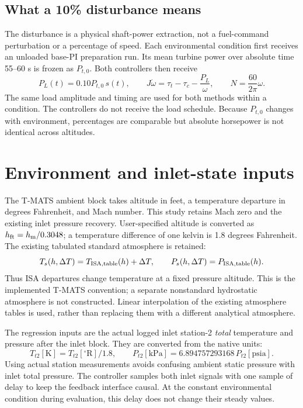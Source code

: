 \subsection{What a 10\% disturbance means}
The disturbance is a physical shaft-power extraction, not a fuel-command perturbation or a percentage of speed. Each environmental condition first receives an unloaded base-PI preparation run. Its mean turbine power over absolute time 55--60 s is frozen as $P_{t,0}$. Both controllers then receive
\begin{equation}
P_L(t)=0.10P_{t,0}\,s(t),\qquad
J\dot\omega=\tau_t-\tau_c-\frac{P_L}{\omega},\qquad N=\frac{60}{2\pi}\omega.
\end{equation}
The same load amplitude and timing are used for both methods within a condition. The controllers do not receive the load schedule. Because $P_{t,0}$ changes with environment, percentages are comparable but absolute horsepower is not identical across altitudes.

\clearpage
\section{Environment and inlet-state inputs}
The T-MATS ambient block takes altitude in feet, a temperature departure in degrees Fahrenheit, and Mach number. This study retains Mach zero and the existing inlet pressure recovery. User-specified altitude is converted as $h_{\rm ft}=h_{\rm m}/0.3048$; a temperature difference of one kelvin is 1.8 degrees Fahrenheit. The existing tabulated standard atmosphere is retained:
\begin{equation}
T_s(h,\Delta T)=T_{\rm ISA,table}(h)+\Delta T,\qquad
P_s(h,\Delta T)=P_{\rm ISA,table}(h).
\end{equation}
Thus ISA departures change temperature at a fixed pressure altitude. This is the implemented T-MATS convention; a separate nonstandard hydrostatic atmosphere is not constructed. Linear interpolation of the existing atmosphere tables is used, rather than replacing them with a different analytical atmosphere.

The regression inputs are the actual logged inlet station-2 \emph{total} temperature and pressure after the inlet block. They are converted from the native units:
\begin{equation}
T_{t2}[\mathrm K]=T_{t2}[{}^\circ\mathrm R]/1.8,
\qquad P_{t2}[\mathrm{kPa}]=6.894757293168\,P_{t2}[\mathrm{psia}].
\end{equation}
Using actual station measurements avoids confusing ambient static pressure with inlet total pressure. The controller samples both inlet signals with one sample of delay to keep the feedback interface causal. At the constant environmental condition during evaluation, this delay does not change their steady values.

